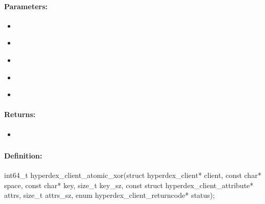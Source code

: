 \paragraph{Parameters:}
\begin{itemize}[noitemsep]
\item {}\\

\item {}\\

\item {}\\

\item {}\\

\item {}\\

\end{itemize}

\paragraph{Returns:}
\begin{itemize}[noitemsep]
\item {}\\

\end{itemize}

\pagebreak
\subsubsection{}
\label{api:c:atomic_xor}


\paragraph{Definition:}
\begin{ccode}
int64_t hyperdex_client_atomic_xor(struct hyperdex_client* client,
        const char* space,
        const char* key, size_t key_sz,
        const struct hyperdex_client_attribute* attrs, size_t attrs_sz,
        enum hyperdex_client_returncode* status);
\end{ccode}

